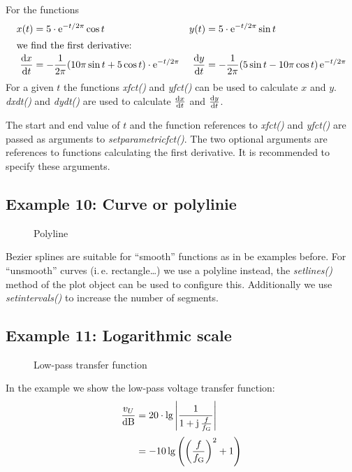 \documentclass[origlongtable]{scrartcl}
\newcommand{\includepgfimage}[2]{%
\begin{figure}%
{\centering%
\caption{#2}\label{fig:#1}%
}%
\end{figure}%
}
\begin{document}
For the functions
\begin{align*}
x(t)&=5\cdot\operatorname{e}^{-t/2\pi}\cos{t}&y(t)&=5\cdot\operatorname{e}^{-t/2\pi}\sin{t}\\
\intertext{we find the first derivative:}
\frac{\mathrm{d} x}{\mathrm{d} t}&=-\frac{1}{2\pi}(10\pi\sin{t}+5\cos{t})\cdot\operatorname{e}^{-t/2\pi}&\frac{\mathrm{d} y}{\mathrm{d} t}&=-\frac{1}{2\pi}(5\sin{t}-10\pi\cos{t})\operatorname{e}^{-t/2\pi}\end{align*}
For a given \(t\) the functions \textit{xfct()\/} and \textit{yfct()\/}
can be used to calculate \(x\) and \(y\).
\textit{dxdt()\/} and \textit{dydt()\/} are used to calculate
\(\tfrac{\mathrm{d} x}{\mathrm{d} t}\) and \(\tfrac{\mathrm{d} y}{\mathrm{d} t}\).

The start and end value of \(t\) and the function references to
\textit{xfct()\/} and \textit{yfct()\/} are passed as arguments
to \textit{set\textunderscore{}parametric\textunderscore{}fct()\/}.
The two optional arguments are references to functions calculating
the first derivative. It is recommended to specify these arguments.


\clearpage
\subsection[Polyline]{Example 10: Curve or polylinie}
\includepgfimage{../examples/test011a}{Polyline}
Bezier splines are suitable for ``smooth'' functions as in be examples
before. For ``unsmooth'' curves (i.\,e. rectangle\ldots) we use
a polyline instead, the \textit{set\textunderscore{}lines()\/}
method of the plot object can be used to configure this.
Additionally we use \textit{set\textunderscore{}intervals()\/} to increase
the number of segments.
\clearpage

\clearpage
\subsection[Logarithmic scale]{Example 11: Logarithmic scale}
\includepgfimage{../examples/test012a}{Low-pass transfer function}
In the example we show the low-pass voltage transfer
function:
\begin{align*}
\frac{v_U}{\text{dB}}&=20\cdot\lg{\left|\frac{1}{1+\operatorname{\text{j}}\frac{f}{f_{\text{G}}}}\right|}\\[0.2em]
&=-10\lg{\left({\left(\frac{f}{f_{\text{G}}}\right)}^2+1\right)}\end{align*}
\end{document}
